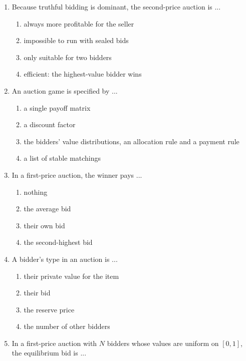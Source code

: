 \documentclass[11pt]{article}
\begin{document}
\begin{enumerate}[itemsep=6pt]
\begin{enumerate}
    \item first-price and second-price auctions raise the same expected revenue (under its conditions)
    \item the winner always pays the same as the loser
    \item the seller always prefers a first-price auction
    \item revenue is always zero
  \end{enumerate}
  \item Because truthful bidding is dominant, the second-price auction is ...
  \begin{enumerate}
    \item always more profitable for the seller
    \item impossible to run with sealed bids
    \item only suitable for two bidders
    \item efficient: the highest-value bidder wins
  \end{enumerate}
  \item An auction game is specified by ...
  \begin{enumerate}
    \item a single payoff matrix
    \item a discount factor
    \item the bidders' value distributions, an allocation rule and a payment rule
    \item a list of stable matchings
  \end{enumerate}
  \item In a first-price auction, the winner pays ...
  \begin{enumerate}
    \item nothing
    \item the average bid
    \item their own bid
    \item the second-highest bid
  \end{enumerate}
  \item A bidder's type in an auction is ...
  \begin{enumerate}
    \item their private value for the item
    \item their bid
    \item the reserve price
    \item the number of other bidders
  \end{enumerate}
  \item In a first-price auction with \(N\) bidders whose values are uniform on \([0,1]\), the equilibrium bid is ...

\end{enumerate}
\end{document}
